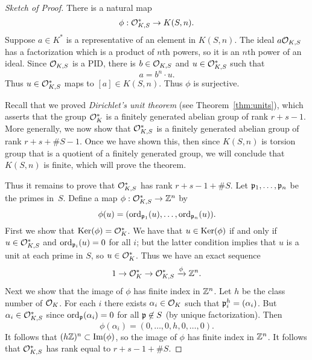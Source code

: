 \begin{proof}[Sketch of Proof]
	There is a natural map
	$$
	\phi: \mathcal{O}_{K,S}^* \to K(S,n).
	$$
	Suppose $a\in K^*$ is a representative of an element in $K(S,n)$.
	The ideal $a \mathcal{O}_{K,S}$ has a factorization which is a product of $n$th
	powers, so it is an $n$th power of an ideal. Since $\mathcal{O}_{K,S}$ is a PID,
	there is $b\in \mathcal{O}_{K,S}$ and $u\in \mathcal{O}_{K,S}^*$ such that
	$$
	   a = b^n \cdot u.
	$$
	Thus $u\in \mathcal{O}_{K,S}^*$ maps to $[a] \in K(S,n)$.  Thus $\phi$
	is surjective.
	
	Recall that we proved {\em Dirichlet's unit theorem} (see
	Theorem~\ref{thm:units}), which asserts that the group $\mathcal{O}_K^*$ is a
	finitely generated abelian group of rank $r+s-1$.  More generally, we
	now show that $\mathcal{O}_{K,S}^*$ is a finitely generated abelian group of
	rank $r+s+\#S -1$.  Once we have shown this, then since $K(S,n)$ is torsion
	group that is a quotient of a finitely generated group, we will conclude
	that $K(S,n)$ is finite,
	which will prove the theorem.
	
	Thus it remains to prove that $\mathcal{O}_{K,S}^*$ has rank $r+s-1 + \#S$.
	Let $\mathfrak{p}_1,\ldots, \mathfrak{p}_n$ be the primes in~$S$.
	Define a map $\phi: \mathcal{O}_{K,S}^* \to \mathbb{Z}^n$ by
	$$
		\phi(u) = (\operatorname{ord}_{\mathfrak{p}_1}(u), \ldots, \operatorname{ord}_{\mathfrak{p}_n}(u)).
	$$
	First we show that $\operatorname{Ker}(\phi) = \mathcal{O}_K^*$.  We have that
	$u\in \operatorname{Ker}(\phi)$ if and only if $u \in \mathcal{O}_{K,S}^*$
	and $\operatorname{ord}_{\mathfrak{p}_i}(u) = 0$ for all $i$; but the latter condition
	implies that $u$ is a unit at each prime in $S$, so $u\in \mathcal{O}_K^*$.
	Thus we have an exact sequence
	$$
		1 \to \mathcal{O}_K^* \to \mathcal{O}_{K,S}^* \xrightarrow{\phi} \mathbb{Z}^n.
	$$
	Next we show that the image of $\phi$ has finite index
	in $\mathbb{Z}^n$.  Let $h$ be the class number of $\mathcal{O}_K$.
	For each $i$ there exists $\alpha_i \in \mathcal{O}_K$
	such that $\mathfrak{p}_i^h = (\alpha_i)$.  But $\alpha_i \in \mathcal{O}_{K,S}^*$
	since $\operatorname{ord}_{\mathfrak{p}}(\alpha_i) = 0$ for all $\mathfrak{p}\not\in S$ (by unique
	factorization). Then
	$$
		\phi(\alpha_i) = (0,\ldots, 0, h, 0,\ldots, 0).
	$$
	It follows that $(h\mathbb{Z})^n \subset \text{Im}(\phi)$, so
	the image of $\phi$ has finite index in $\mathbb{Z}^n$.  It follows
	that $\mathcal{O}_{K,S}^*$ has rank equal to $r+s-1+\#S$.
\end{proof}


